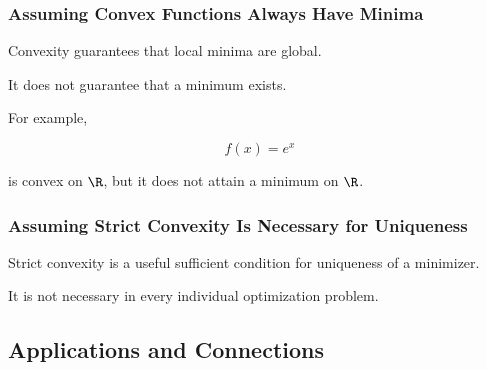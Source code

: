 \subsubsection{Assuming Convex Functions Always Have Minima}

Convexity guarantees that local minima are global.

It does not guarantee that a minimum exists.

For example,

\[
f(x)=e^x
\]

is convex on \(\R\), but it does not attain a minimum on \(\R\).

\subsubsection{Assuming Strict Convexity Is Necessary for Uniqueness}

Strict convexity is a useful sufficient condition for uniqueness of a
minimizer.

It is not necessary in every individual optimization problem.

\subsection{Applications and Connections}
\label{subsec:convex-geometry-applications}

